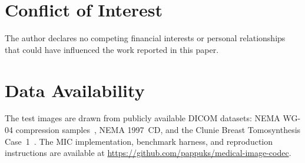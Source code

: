 \documentclass[journal]{IEEEtran}
\begin{document}
\section*{Conflict of Interest}

The author declares no competing financial interests or personal relationships
that could have influenced the work reported in this paper.

\section*{Data Availability}

The test images are drawn from publicly available DICOM datasets:
NEMA WG-04 compression samples~\cite{nema_wg04}, NEMA 1997~CD, and the
Clunie Breast Tomosynthesis Case~1~\cite{clunie_tomo}. The MIC implementation,
benchmark harness, and reproduction instructions are available at
\url{https://github.com/pappuks/medical-image-codec}.

\end{document}
